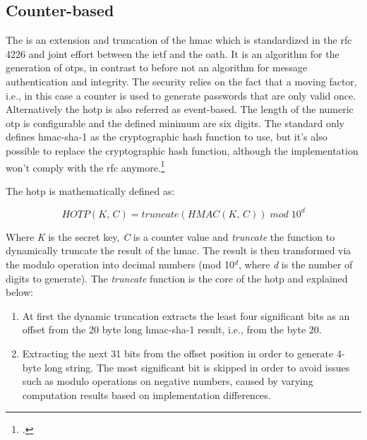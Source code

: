 \subsection{Counter-based} %
\label{subsec:hotp}

The  is an extension and truncation of the \gls{hmac} which is standardized in the \gls{rfc} 4226 and joint effort between the \gls{ietf} and the \gls{oath}. It is an algorithm for the generation of \glspl{otp}, in contrast to before not an algorithm for message authentication and integrity. The security relies on the fact that a \flqq moving factor\frqq{}, i.e., in this case a counter is used to generate passwords that are only valid once. Alternatively the \gls{hotp} is also referred as event-based. The length of the numeric \gls{otp} is configurable and the defined minimum are six digits. The standard only defines \gls{hmac}-\gls{sha}-1 as the cryptographic hash function to use, but it's also possible to replace the cryptographic hash function, although the implementation won't comply with the \gls{rfc} anymore.\footcites[See][]{m2005rfc}[See][Chapter 3]{9781849287333}

The \gls{hotp} is mathematically defined as:

\begin{equation*}
	HOTP(K,\, C) = truncate(HMAC(K,\, C))\; mod \; 10^d
\end{equation*}

Where \textit{K} is the secret key, \textit{C} is a counter value and \textit{truncate} the function to dynamically truncate the result of the \gls{hmac}. The result is then transformed via the modulo operation into decimal numbers  (mod 10$^d$, where \textit{d} is the number of digits to generate). The \textit{truncate} function is the core of the \gls{hotp} and explained below:

\begin{enumerate}
	\item At first the dynamic truncation extracts the least four significant bits as an offset from the 20 byte long \gls{hmac}-\gls{sha}-1 result, i.e., from the byte 20.
	\item Extracting the next 31 bits from the offset position in order to generate 4-byte long string. The most significant bit is skipped in order to avoid issues such as modulo operations on negative numbers, caused by varying computation results based on implementation differences.
\end{enumerate}

